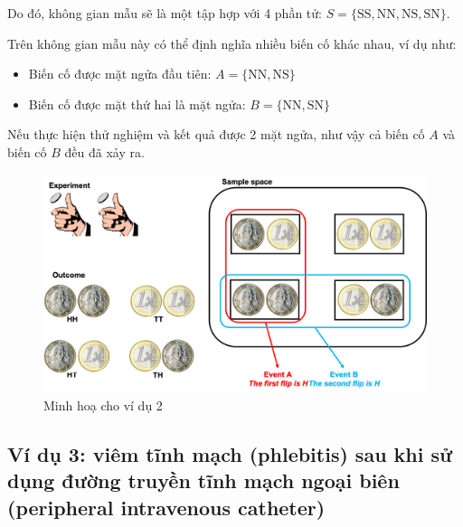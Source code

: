 \documentclass[
]{book}
\providecommand{\tightlist}{%
  \setlength{\itemsep}{0pt}\setlength{\parskip}{0pt}}
\begin{document}
Do đó, không gian mẫu sẽ là một tập hợp với 4 phần tử: \(S = \{\text{SS},\text{NN},\text{NS},\text{SN}\}\).

Trên không gian mẫu này có thể định nghĩa nhiều biến cố khác nhau, ví dụ như:

\begin{itemize}
\tightlist
\item
  Biến cố được mặt ngửa đầu tiên: \(A = \{\text{NN},\text{NS}\}\)
\item
  Biến cố được mặt thứ hai là mặt ngửa: \(B = \{\text{NN},\text{SN}\}\)
\end{itemize}

Nếu thực hiện thử nghiệm và kết quả được 2 mặt ngửa, như vậy cả biến cố \(A\) và biến cố \(B\) đều đã xảy ra.

\begin{figure}

{\centering \includegraphics[width=1\linewidth]{figures/Picture02} 

}

\caption{Minh hoạ cho ví dụ 2}\label{fig:example2}
\end{figure}

\hypertarget{vuxed-dux1ee5-3-viuxeam-tux129nh-mux1ea1ch-phlebitis-sau-khi-sux1eed-dux1ee5ng-ux111ux1b0ux1eddng-truyux1ec1n-tux129nh-mux1ea1ch-ngoux1ea1i-biuxean-peripheral-intravenous-catheter}{%
\subsection{Ví dụ 3: viêm tĩnh mạch (phlebitis) sau khi sử dụng đường truyền tĩnh mạch ngoại biên (peripheral intravenous catheter)}\label{vuxed-dux1ee5-3-viuxeam-tux129nh-mux1ea1ch-phlebitis-sau-khi-sux1eed-dux1ee5ng-ux111ux1b0ux1eddng-truyux1ec1n-tux129nh-mux1ea1ch-ngoux1ea1i-biuxean-peripheral-intravenous-catheter}}
\end{document}
